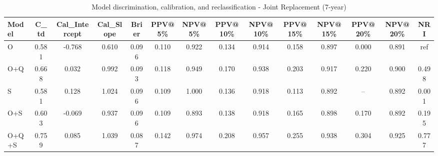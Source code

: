 \begin{table}[htbp]
\centering
\small
\caption{Model discrimination, calibration, and reclassification - Joint Replacement (7-year)}
\label{tab:perf_joint_7y}
\begin{tabular}{lccccccccccccc}
\toprule
Model & C\_td & Cal\_Intercept & Cal\_Slope & Brier & PPV@5\% & NPV@5\% & PPV@10\% & NPV@10\% & PPV@15\% & NPV@15\% & PPV@20\% & NPV@20\% & NRI \\
\midrule
O & 0.581 & -0.768 & 0.610 & 0.096 & 0.110 & 0.922 & 0.134 & 0.914 & 0.158 & 0.897 & 0.000 & 0.891 & ref \\
O+Q & 0.668 & 0.032 & 0.992 & 0.093 & 0.118 & 0.949 & 0.170 & 0.938 & 0.203 & 0.917 & 0.220 & 0.900 & 0.498 \\
S & 0.581 & 0.128 & 1.024 & 0.096 & 0.109 & 1.000 & 0.136 & 0.918 & 0.113 & 0.892 & -- & 0.892 & 0.001 \\
O+S & 0.603 & -0.069 & 0.937 & 0.096 & 0.109 & 0.893 & 0.138 & 0.918 & 0.165 & 0.898 & 0.170 & 0.892 & 0.195 \\
O+Q+S & 0.759 & 0.085 & 1.039 & 0.087 & 0.142 & 0.974 & 0.208 & 0.957 & 0.255 & 0.938 & 0.304 & 0.925 & 0.777 \\
\bottomrule
\end{tabular}
\end{table}